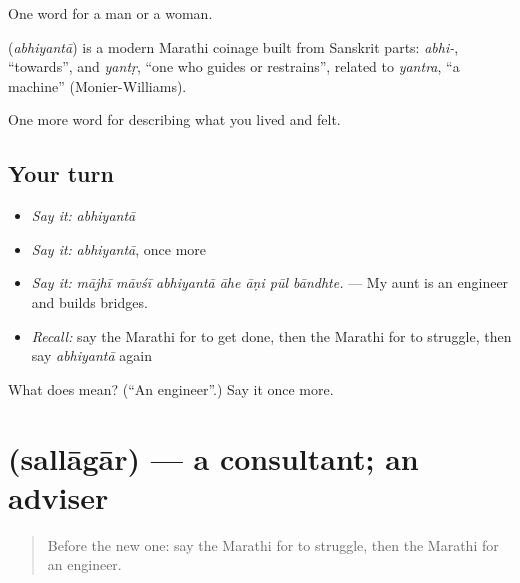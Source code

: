 One word for a man or a woman.

\begin{cousinweb}
\textbf{} (\emph{abhiyantā}) is a modern Marathi coinage built from Sanskrit parts: \emph{abhi-}, \textquotedblleft{}towards\textquotedblright{}, and \emph{yantṛ}, \textquotedblleft{}one who guides or restrains\textquotedblright{}, related to \emph{yantra}, \textquotedblleft{}a machine\textquotedblright{} (Monier-Williams).
\end{cousinweb}

\begin{grammarlens}[title={What you've built}]
One more word for describing what you lived and felt.
\end{grammarlens}

\subsection*{Your turn}
\begin{itemize}
\raggedright
  \item \emph{Say it:} \emph{abhiyantā}
  \item \emph{Say it:} \emph{abhiyantā}, once more
  \item \emph{Say it:} \emph{mājhī māvśī abhiyantā āhe āṇi pūl bāndhte.} — My aunt is an engineer and builds bridges.
  \item \emph{Recall:} say the Marathi for to get done, then the Marathi for to struggle, then say \emph{abhiyantā} again
\end{itemize}

\begin{tcolorbox}[breakable,colback=teal!4,colframe=teal!35!black,title={Before you move on}]
What does  mean? (\textquotedblleft{}An engineer\textquotedblright{}.) Say it once more.
\end{tcolorbox}
\section[\texorpdfstring{\mr{सल्लागार} (sallāgār)}{सल्लागार (sallāgār)}]{ (sallāgār) — a consultant; an adviser}

\label{lesson:MR-C515-sallagar}



\begin{quote}
Before the new one: say the Marathi for to struggle, then the Marathi for an engineer.
\end{quote}

